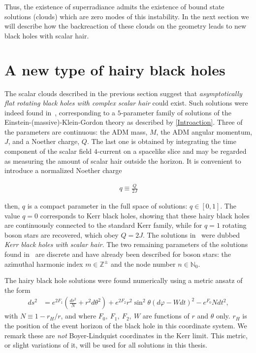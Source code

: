 Thus, the existence of superradiance admits the existence of bound state solutions (clouds) which are zero modes of this instability.
In the next section we will describe how the backreaction of these clouds on the geometry leads to new black holes with scalar hair.

\section{A new type of hairy black holes}
\label{sec:HBHs}
The scalar clouds described in the previous section suggest that \textit{asymptotically flat rotating black holes with complex scalar hair} could exist.
Such solutions were indeed found in~\cite{Herdeiro:2014goa}, corresponding to a $5$-parameter family of solutions of the Einstein-(massive)-Klein-Gordon theory as described by \eqref{Introaction}.
Three of the parameters are continuous: the ADM mass, $M$, the ADM angular momentum, $J$, and a Noether charge, $Q$.
The last one is obtained by integrating the time component of the scalar field $4$-current on a spacelike slice and may be regarded as measuring the amount of scalar hair outside the horizon.
It is convenient to introduce a normalized Noether charge

\begin{align*}
q\equiv \frac{Q}{2J}
\end{align*}

then, $q$ is a compact parameter in the full space of solutions: $q\in\left[0,1\right]$.
The value $q=0$ corresponds to Kerr black holes, showing that these hairy black holes are continuously connected to the standard Kerr family, while for $q=1$ rotating boson stars are recovered, which obey $Q=2J$.
The solutions in~\cite{Herdeiro:2014goa} were dubbed \textit{Kerr black holes with scalar hair}.
The two remaining parameters of the solutions found in~\cite{Herdeiro:2014goa} are discrete and have already been described for boson stars: the azimuthal harmonic index $m\in \mathbb{Z}^\pm$ and the node number $n\in \mathbb{N}_0$. 

The hairy black hole solutions were found numerically using a metric ansatz of the form
\begin{align}
  ds^2 &= e^{2F_1}\left( \frac{dr^2}{N} + r^2d\theta^2 \right) + e^{2F_2}r^2\sin^2\theta \left( d\varphi - Wdt \right)^2 - e^{F_0}Ndt^2,
  \label{eqn:HBH-ansatz}
\end{align}
with $N\equiv 1-r_H/r$, and where $F_0,~F_1,~F_2,~W$ are functions of $r$ and $\theta$ only.
$r_H$ is the position of the event horizon of the black hole in this coordinate system.
We remark these are \textit{not} Boyer-Lindquist coordinates in the Kerr limit. 
This metric, or slight variations of it, will be used for all solutions in this thesis.

